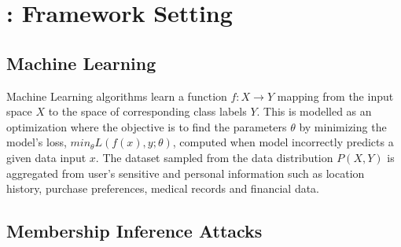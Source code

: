\section{\method: Framework Setting}\label{background}

\subsection{Machine Learning}
Machine Learning algorithms learn a function $f:X \rightarrow Y$ mapping from the input space $X$ to the space of corresponding class labels $Y$.
This is modelled as an optimization where the objective is to find the parameters $\theta$ by minimizing the model's loss, $min_{\theta} L(f(x),y;\theta)$, computed when model incorrectly predicts a given data input $x$.
The dataset sampled from the data distribution $P(X,Y)$ is aggregated from user's sensitive and personal information such as location history, purchase preferences, medical records and financial data.

\subsection{Membership Inference Attacks}


